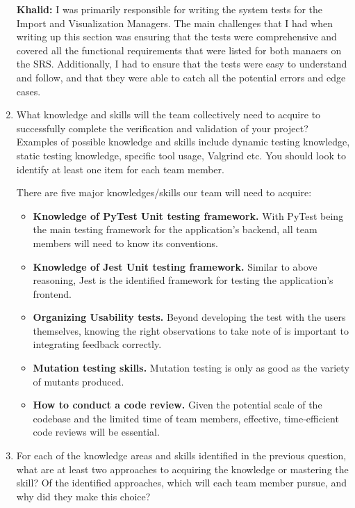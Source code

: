\documentclass[12pt, titlepage]{article}
\begin{document}
\begin{enumerate}
\newline
\newline
\textbf{Khalid: }I was primarily responsible for writing the system tests for the Import and Visualization Managers. The main challenges that I had when writing up this section was ensuring that the tests were comprehensive and covered all the functional requirements that were listed for both manaers on the SRS. Additionally, I had to ensure that the tests were easy to understand and follow, and that they were able to catch all the potential errors and edge cases.

  \item What knowledge and skills will the team collectively need to acquire to
  successfully complete the verification and validation of your project?
  Examples of possible knowledge and skills include dynamic testing knowledge,
  static testing knowledge, specific tool usage, Valgrind etc.  You should look to
  identify at least one item for each team member.

  There are five major knowledges/skills our team will need to acquire:

  \begin{itemize}
    \item \textbf{Knowledge of PyTest Unit testing framework.} With PyTest being the main testing framework for the application's backend, 
    all team members will need to know its conventions.
    \item \textbf{Knowledge of Jest Unit testing framework.} Similar to above reasoning, Jest is the identified framework for testing
    the application's frontend.
    \item \textbf{Organizing Usability tests.} Beyond developing the test with the users themselves, knowing the right observations to take 
    note of is important to integrating feedback correctly.
    \item \textbf{Mutation testing skills.} Mutation testing is only as good as the variety of mutants produced.
    \item \textbf{How to conduct a code review.} Given the potential scale of the codebase and the limited time of team members, effective,
    time-efficient code reviews will be essential.
  \end{itemize}

  \item For each of the knowledge areas and skills identified in the previous
  question, what are at least two approaches to acquiring the knowledge or
  mastering the skill?  Of the identified approaches, which will each team
  member pursue, and why did they make this choice?


\end{enumerate}
\end{document}
